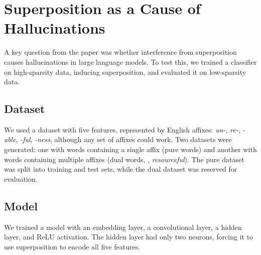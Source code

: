 \section{Superposition as a Cause of Hallucinations}
\label{sec:superposition_as_a_cause_of_hallucinations}

A key question from the paper was whether interference from superposition causes hallucinations in large language models.
To test this, we trained a classifier on high-sparsity data, inducing superposition, and evaluated it on low-sparsity data.

\subsection{Dataset}
We used a dataset with five features, represented by English affixes: \textit{un-}, \textit{re-}, \textit{-able}, \textit{-ful}, \textit{-ness}, although any set of affixes could work.
Two datasets were generated: one with words containing a single affix (pure words) and another with words containing multiple affixes (dual words, \eg, \textit{resourceful}).
The pure dataset was split into training and test sets, while the dual dataset was reserved for evaluation.

\subsection{Model}
We trained a model with an embedding layer, a convolutional layer, a hidden layer, and ReLU activation.
The hidden layer had only two neurons, forcing it to use superposition to encode all five features.

